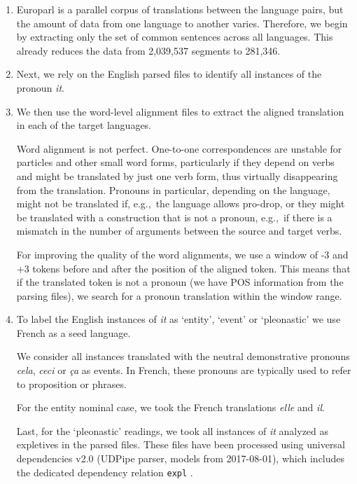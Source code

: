 \documentclass[10pt, a4paper]{article}
\begin{document}
\begin{enumerate}\setlength\itemsep{1em}

\item Europarl is a parallel corpus of translations
between the language pairs, but the amount of data from one language to another
varies. Therefore, we begin by extracting only the set of common sentences
across all languages. This already reduces the data from 2,039,537 segments to
281,346. 

\item  Next, we rely on the English parsed files to
identify all instances of the pronoun \textit{it}.

\item We then use the word-level alignment files to
extract the aligned translation in each of the target languages.

Word alignment is not perfect. One-to-one correspondences are unstable for
particles and other small word forms, particularly if they depend on verbs and 
might be translated by just one verb form, thus virtually disappearing from the
translation. Pronouns in particular, depending on the language, might not be
translated if, e.g.,~the language allows pro-drop, or they might be
translated with a construction that is not a pronoun, e.g.,~if there is a 
mismatch in the number of arguments between the source and target verbs.


For improving the quality of the word alignments, we use a window of -3 and
+3 tokens before and after the position of the aligned token. This means that if
the translated token is not a pronoun (we have POS information from the parsing
files), we search for a pronoun translation within the window range.

\item To label the English instances of \textit{it} as `entity', `event' or 
`pleonastic' we use French as a seed language.

We consider all instances 
translated with the neutral demonstrative pronouns \textit{cela}, \textit{ceci} or 
\textit{ça} as events. In French, these pronouns are typically used to refer to 
proposition or phrases. 

For the entity nominal case, we took the French translations \textit{elle} and 
\textit{il}.

Last, for the `pleonastic' readings, we took all instances of \textit{it} analyzed 
as expletives in the parsed files. These files have been processed using universal 
dependencies v2.0 (UDPipe parser, models from 2017-08-01), which includes the 
dedicated dependency relation \texttt{expl} \cite{bouma-etal-2018-expletives}.


\end{enumerate}
\end{document}
